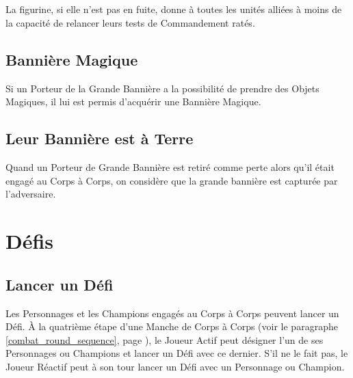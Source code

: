 \subsection{\holdyourground}

La figurine, si elle n'est pas en fuite, donne à toutes les unités alliées à moins de  la capacité de relancer leurs tests de Commandement ratés. 

\subsection{Bannière Magique}

Si un Porteur de la Grande Bannière a la possibilité de prendre des Objets Magiques, il lui est permis d'acquérir une Bannière Magique. 

\subsection{Leur Bannière est à Terre}

Quand un Porteur de Grande Bannière est retiré comme perte alors qu'il était engagé au Corps à Corps, on considère que la grande bannière est capturée par l'adversaire. 

\hypertarget{challenges}{\section{Défis}}

\subsection{Lancer un Défi}

Les Personnages et les Champions engagés au Corps à Corps peuvent lancer un Défi. À la quatrième étape d'une Manche de Corps à Corps (voir le paragraphe \ref{combat_round_sequence}, page \pageref{combat_round_sequence}), le Joueur Actif peut désigner l'un de ses Personnages ou Champions et lancer un Défi avec ce dernier. S'il ne le fait pas, le Joueur Réactif peut à son tour lancer un Défi avec un Personnage ou Champion.

